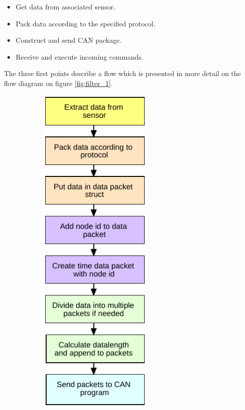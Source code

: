 \begin{itemize}
\item Get data from associated sensor.
\item Pack data according to the specified protocol.
\item Construct and send CAN package.
\item Receive and execute incoming commands.
\end{itemize}

The three first points describe a flow which is presented in more detail on the flow diagram on figure \ref{fig:filter_1}.

\begin{figure}[!h]
\centering
\begin{subfigure}{0.45\textwidth}
\centering
\includegraphics[width=0.60\textwidth]{graphics/FlowChart_Node_Packing}

\end{subfigure}
\end{figure}
